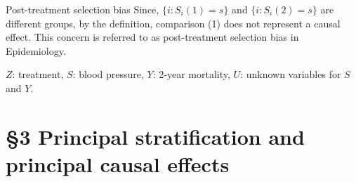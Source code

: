 \documentclass[10pt]{beamer}
\begin{document}
\begin{frame}{Post-treatment selection bias}
Since,   $\{i: S_i(1) = s\}$ and  $\{i: S_i(2) = s\}$ are different groups, by the definition, comparison (1) does not represent a causal effect. This concern is referred to as post-treatment selection bias in Epidemiology.


\begin{figure}[h]
\centering
{}
\end{figure}

$Z$: treatment, $S$: blood pressure, $Y$: 2-year mortality, $U$: unknown variables for $S$ and $Y$.
\end{frame}

\section{\S 3 Principal stratification and principal causal effects}
\end{document}
